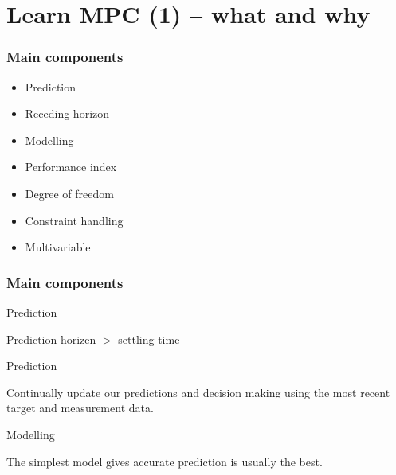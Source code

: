 \documentclass{beamer}
\begin{document}
\section{Learn MPC (1) -- what and why}

\begin{frame}
\frametitle{Main components}


\begin{itemize}
	\item Prediction
	\item Receding horizon
	\item Modelling
	\item Performance index
	\item Degree of freedom
	\item Constraint handling
	\item Multivariable
\end{itemize}

\end{frame}

\begin{frame}
\frametitle{Main components}
\begin{block}{Prediction}
	
	Prediction horizen $>$ settling time
\end{block}

\begin{block}{Prediction}
	
	Continually update our predictions and decision making using the most recent target and measurement data.
\end{block}

\begin{block}{Modelling}
	
	The simplest model gives accurate prediction is usually the best.
\end{block}

\end{frame}
\end{document}
